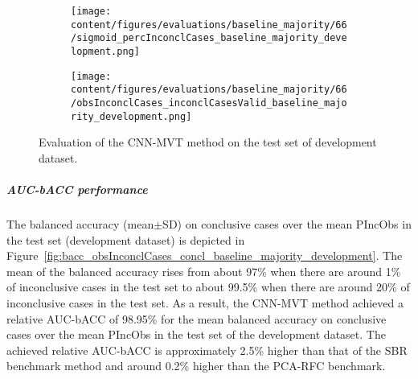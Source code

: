 \begin{figure}[ht]
  \begin{subfigure}{0.48\textwidth}
    \centering
    \texttt{[image: content/figures/evaluations/baseline\_majority/66/sigmoid\_percInconclCases\_baseline\_majority\_development.png]}
    \label{fig:baseline_majority_percInconclCases_development}
  \end{subfigure}
  \hfill
  \begin{subfigure}{0.495\textwidth}
    \centering
    \texttt{[image: content/figures/evaluations/baseline\_majority/66/obsInconclCases\_inconclCasesValid\_baseline\_majority\_development.png]}
    \label{fig:obsInconclCases_inconclCasesValid_baseline_majority_development}
  \end{subfigure}

  \caption{Evaluation of the CNN-MVT method on the test set of development dataset.}
  \label{fig:eval_cnn_mvt_dev}
\end{figure}


\subparagraph{AUC-bACC performance}

The balanced accuracy (mean$\pm$SD) on conclusive cases over the mean PIncObs
in the test set (development dataset) 
is depicted in Figure~\ref{fig:bacc_obsInconclCases_concl_baseline_majority_development}.
The mean of the balanced accuracy rises from about 97\% 
when there are around 1\% of inconclusive cases in the test set to about 99.5\% 
when there are around 20\% of inconclusive cases in the test set.
As a result, the CNN-MVT method achieved a relative AUC-bACC of 98.95\% for the mean balanced accuracy on conclusive cases
over the mean PIncObs in the test set of the development dataset.
The achieved relative AUC-bACC is approximately 2.5\% higher than that of the SBR benchmark method 
and around 0.2\% higher than the PCA-RFC benchmark.


